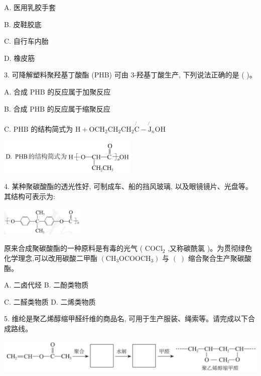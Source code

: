 \documentclass[10pt]{article}
\begin{document}
A. 医用乳胶手套

B. 皮鞋胶底

C. 自行车内胎

D. 橡皮筋

3. 可降解塑料聚羟基丁酸酯 (PHB) 可由 3-羟基丁酸生产, 下列说法正确的是 ( )。

A. 合成 \(\mathrm{{PHB}}\) 的反应属于加聚反应

B. 合成 \(\mathrm{{PHB}}\) 的反应属于缩聚反应

C. \(\mathrm{{PHB}}\) 的结构简式为 \(\mathrm{H} + {\mathrm{{OCH}}}_{2}{\mathrm{{CH}}}_{2}{\mathrm{{CH}}}_{2}\overset{\not{} }{\mathrm{C}} - {\overset{\not{} }{\mathrm{J}}}_{n}\mathrm{{OH}}\)

\begin{center}
\includegraphics[max width=0.5\textwidth]{images/0190efc5-b58a-7c43-bfb0-e0a030df9cfd_155_871018.jpg}
\end{center}

4. 某种聚碳酸酯的透光性好, 可制成车、船的挡风玻璃, 以及眼镜镜片、光盘等。其结构可表示为:

\begin{center}
\includegraphics[max width=0.3\textwidth]{images/0190efc5-b58a-7c43-bfb0-e0a030df9cfd_155_773773.jpg}
\end{center}

原来合成聚碳酸酯的一种原料是有毒的光气 ( \({\mathrm{{COCl}}}_{2}\) ,又称碳酰氯 )。为贯彻绿色化学理念,可以改用碳酸二甲酯 \(\left( {{\mathrm{{CH}}}_{3}{\mathrm{{OCOOCH}}}_{3}}\right)\) 与 \(\left( \;\right)\) 缩合聚合生产聚碳酸酯。

A. 二卤代烃 B. 二酚类物质

C. 二醛类物质 D. 二烯类物质

5. 维纶是聚乙烯醇缩甲醛纤维的商品名, 可用于生产服装、绳索等。请完成以下合成路线。

\begin{center}
\includegraphics[max width=1.0\textwidth]{images/0190efc5-b58a-7c43-bfb0-e0a030df9cfd_155_207153.jpg}
\end{center}
\end{document}
